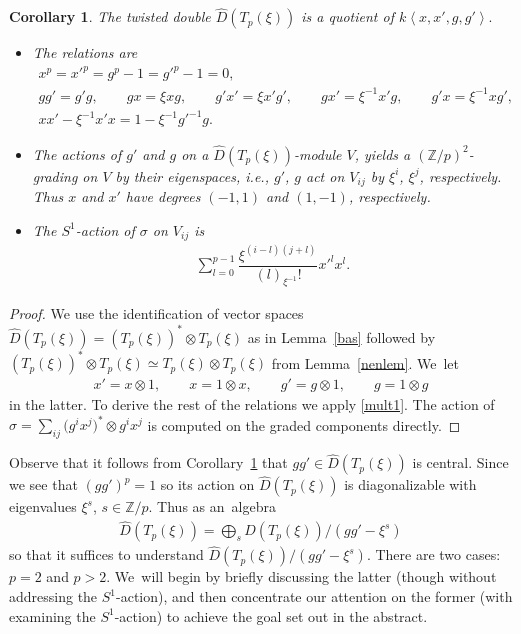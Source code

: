 \documentclass[pdftex]{sigma}
\numberwithin{equation}{section}
\newtheorem{Corollary}[Theorem]{Corollary}
\newcommand{\ot}{\otimes}
\newcommand{\zp}{\mathbb{Z}/p}
\begin{document}
\begin{Corollary}\label{gens}The twisted double $\widehat{D}(T_p(\xi))$ is a quotient of $k\left\langle x,x',g,g'\right\rangle.$

\begin{itemize}\itemsep=0pt
\item The relations are
\begin{gather*}
x^p=x'^p=g^p-1=g'^p-1=0,
\\
gg'=g'g,\qquad
gx=\xi xg,\qquad
g'x'=\xi x'g',\qquad
gx'=\xi^{-1} x'g, \qquad
g'x=\xi^{-1} xg',
\\
xx'-\xi^{-1}x'x=1-\xi^{-1}g'^{-1}g.
\end{gather*}

\item The actions of $g'$ and $g$ on a $\widehat{D}(T_p(\xi))$-module $V$, yields a $(\mathbb{Z}/p)^2$-grading on $V$ by their eigenspaces, i.e., $g'$, $g$ act on $V_{ij}$ by $\xi^i$, $\xi^j$, respectively. Thus $x$ and $x'$ have degrees $(-1,1)$ and $(1,-1)$, respectively.

\item The $S^1$-action of $\sigma$ on $V_{ij}$ is
\begin{gather}\label{sigmaaction}
\sum_{l=0}^{p-1}\dfrac{\xi^{(i-l)(j+l)}}{(l)_{\xi^{-1}}!}x'^lx^l.
\end{gather}
\end{itemize}
\end{Corollary}

\begin{proof}
We use the identification of vector spaces $\widehat{D}(T_p(\xi))=(T_p(\xi))^*\ot T_p(\xi)$ as in Lemma~\ref{bas} followed by $(T_p(\xi))^*\ot T_p(\xi) \simeq T_p(\xi)\ot T_p(\xi)$ from Lemma~\ref{nenlem}. We~let
\begin{gather}
x'=x\ot 1, \qquad
x=1\ot x, \qquad
g'=g\ot 1, \qquad
g=1\ot g
\end{gather}
in the latter. To derive the rest of the relations we apply \eqref{mult1}. The action of $\sigma=\sum_{ij}\big(g^ix^j\big)^*\ot g^ix^j$ is computed on the graded components directly.
\end{proof}

Observe that it follows from Corollary~\ref{gens} that $gg'\in\widehat{D}(T_p(\xi))$ is central. Since we see that $(gg')^p=1$ so its action on $\widehat{D}(T_p(\xi))$ is diagonalizable with eigenvalues $\xi^s$, $s\in\zp$. Thus as an~algebra
\begin{gather}\label{split}
\widehat{D}(T_p(\xi))=\bigoplus_s \widehat{D}(T_p(\xi))/(gg'-\xi^s)
\end{gather}
so that it suffices to understand $\widehat{D}(T_p(\xi))/(gg'-\xi^s)$. There are two cases: $p=2$ and $p>2$. We~will begin by briefly discussing the latter (though without addressing the $S^1$-action), and then concentrate our attention on the former (with examining the $S^1$-action) to achieve the goal set out in the abstract.
\end{document}
